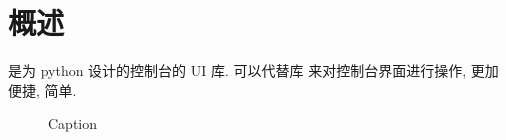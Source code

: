 \section{\urwid{} 概述}
\indent\urwid{} 是为 python 设计的控制台的 UI 库. \urwid{} 可以代替库  来对控制台界面进行操作, 更加便捷, 简单.

\begin{figure}[!htb]
    \centering
    
    \caption{Caption}
    \label{fig:structure_of_urwid_library}
\end{figure}